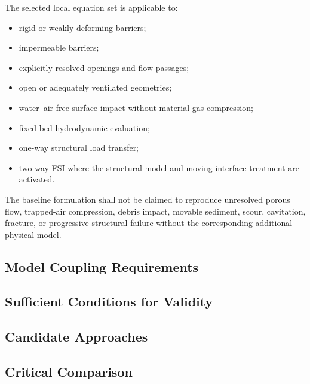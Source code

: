 The selected local equation set is applicable to:

\begin{itemize}
  \item rigid or weakly deforming barriers;
  \item impermeable barriers;
  \item explicitly resolved openings and flow passages;
  \item open or adequately ventilated geometries;
  \item water--air free-surface impact without material gas
    compression;
  \item fixed-bed hydrodynamic evaluation;
  \item one-way structural load transfer;
  \item two-way FSI where the structural model and moving-interface
    treatment are activated.
\end{itemize}

The baseline formulation shall not be claimed to reproduce unresolved
porous flow, trapped-air compression, debris impact, movable sediment,
scour, cavitation, fracture, or progressive structural failure without
the corresponding additional physical model.

\subsection{Model Coupling Requirements}
\label{sec:res-mod-asm-model-coupling-requirements}


\subsection{Sufficient Conditions for Validity}
\label{sec:res-mod-asm-sufficient-conditions-validity}


\subsection{Candidate Approaches}
\label{sec:res-mod-asm-candidate-approaches}


\subsection{Critical Comparison}
\label{sec:res-mod-asm-critical-comparison}

